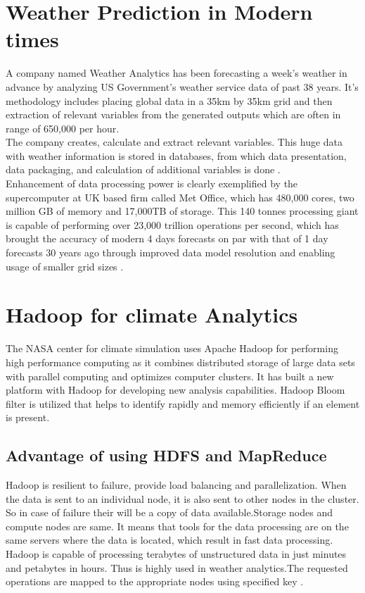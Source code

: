 \documentclass[sigconf]{acmart}
\begin{document}
\section{Weather Prediction in Modern times}

A company named Weather Analytics has been forecasting a week's weather in advance by analyzing US Government's weather service data of past 38 years. It's methodology includes placing global data in a 35km by 35km grid and then extraction of relevant variables from the generated outputs which are often in range of 650,000 per hour.\\

The company creates, calculate and extract relevant variables. This huge data with weather information is stored in databases, from which data presentation, data packaging, and calculation of additional variables is done \cite{Zdnet}.\\

Enhancement of data processing power is clearly exemplified by the supercomputer at UK based firm called Met Office, which has 480,000 cores, two million GB of memory and 17,000TB of storage. This 140 tonnes processing giant is capable of performing over 23,000 trillion operations per second, which has brought the accuracy of modern 4 days forecasts on par with that of 1 day forecasts 30 years ago through improved data model resolution and enabling usage of smaller grid sizes \cite{Zdnet}.

\section{Hadoop for climate Analytics}

The NASA center for climate simulation uses Apache Hadoop for performing high performance computing as it combines distributed storage of large data sets with parallel computing and optimizes computer clusters. It has built a new platform with Hadoop for developing new analysis capabilities. Hadoop Bloom filter is utilized that helps to identify rapidly and memory efficiently if an element is present.\\


\subsection*{Advantage of using HDFS and MapReduce}

Hadoop is resilient to failure, provide load balancing and parallelization. When the data is sent to an individual node, it is also sent to other nodes in the cluster. So in case of failure their will be a copy of data available.Storage nodes and compute nodes are same. It means that tools for the data processing are on the same servers where the data is located, which result in fast data processing. Hadoop is capable of processing terabytes of unstructured data in just minutes and petabytes in hours. Thus is highly used in weather analytics.The requested operations are mapped to the appropriate nodes using specified key \cite{Hadoop01}. \\
\end{document}
